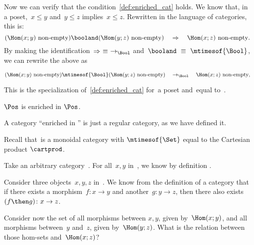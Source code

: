 {\begin{example}
		Now we can verify that the condition~\cref{def:enriched_cat} holds.
		We know that, in a poset,~$x \leq y$ and~$y \leq z$ implies~$x \leq z$.
		Rewritten in the language of categories, this is:
		\begin{equation*}
			(\Hom(x;y)\ \text{non-empty})
			\booland
			(\Hom(y; z)\ \text{non-empty})
			\quad
			\Rightarrow
			\quad
			\Hom(x; z)\ \text{non-empty}.
		\end{equation*}
		By making the identification~$\Rightarrow\ \equiv\ \to_{\Bool}$ and~$\booland\ \equiv\ \mtimesof{\Bool}$, we can rewrite the above as
		\begin{widepar}
			\begin{equation*}
				(\Hom(x;y)\ \text{non-empty})
				\mtimesof{\Bool}
				(\Hom(y; z)\ \text{non-empty})
				\quad
				\to_{\Bool}
				\quad
				\Hom(x; z)\ \text{non-empty},
			\end{equation*}
		\end{widepar}
		This is the specialization of~\cref{def:enriched_cat} for~\CatC a poset and~\CatD equal to~\Bool.
	\end{example}
	\begin{example}
		$\Pos$ is enriched in $\Pos$.
	\end{example}

	\begin{example}
	\end{example}

	\begin{example}
		A category ``enriched in \Set'' is just a regular category, as we have defined it.

		Recall that~\Set is a monoidal category with $\mtimesof{\Set}$ equal to the Cartesian product $\cartprod$.

		Take an arbitrary category~\CatC.
		For all~$x, y$ in~\CatC, we know by definition .

		Consider three objects~$x,y,z$ in~\CatC.
		We know from the definition of a category that if there exists a morphism~$f: x \to y$ and another~$g: y \to z$, then there also exists~$(f\then g)\colon x \to z$.

		Consider now the set of all morphisms between $x, y$, given by~$\Hom(x;y)$, and all morphisms between~$y$ and~$z$, given by~$\Hom(y; z)$.
		What is the relation between those hom-sets and~$\Hom(x; z)$?


\end{example}}
